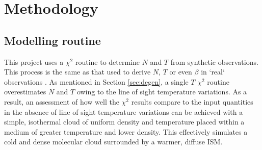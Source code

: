 \documentclass{report}
\begin{document}
\chapter{Methodology}
\section{Modelling routine}
This project uses a $\chi^{2}$ routine to determine $N$ and $T$ from synthetic observations. This process is the same as that used to derive $N$, $T$ or even $\beta$ in `real` observations \parencite{noise,noiseb}. As mentioned in Section \ref{sec:degen}, a single $T$ $\chi^{2}$ routine overestimates $N$ and $T$ owing to the line of sight temperature variations. As a result, an assessment of how well the $\chi^{2}$ results compare to the input quantities in the absence of line of sight temperature variations can be achieved with a simple, isothermal cloud of uniform density and temperature placed within a medium of greater temperature and lower density. This effectively simulates a cold and dense molecular cloud surrounded by a warmer, diffuse ISM.

\end{document}
